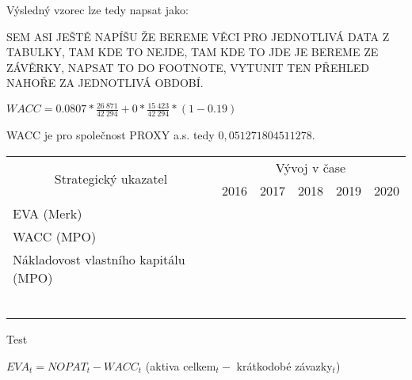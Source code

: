 Výsledný vzorec lze tedy napsat jako:

SEM ASI JEŠTĚ NAPÍŠU ŽE BEREME VĚCI PRO JEDNOTLIVÁ DATA Z TABULKY, TAM KDE TO NEJDE, TAM KDE TO JDE JE BEREME ZE ZÁVĚRKY, NAPSAT TO DO FOOTNOTE, VYTUNIT TEN PŘEHLED NAHOŘE ZA JEDNOTLIVÁ OBDOBÍ.

\begin{center}
$WACC = 0.0807 * \frac{26\ 871}{42\ 294} + 0 * \frac{15\ 423}{42\ 294} * (1 - 0.19)$	
\end{center}

WACC je pro společnost PROXY a.s. tedy $0,051271804511278$.


\begin{table}[!htbp]
\begin{tabular}{llllll}
\hline
\multicolumn{1}{|c|}{\multirow{2}{*}{Strategický ukazatel}} & \multicolumn{5}{c|}{Vývoj v čase} \\ \cline{2-6} 
\multicolumn{1}{|c|}{} & \multicolumn{1}{c|}{2016} & \multicolumn{1}{c|}{2017} & \multicolumn{1}{c|}{2018} & \multicolumn{1}{c|}{2019} & \multicolumn{1}{c|}{2020} \\ \hline
\multicolumn{1}{|l|}{EVA (Merk)} & \multicolumn{1}{l|}{} & \multicolumn{1}{l|}{} & \multicolumn{1}{l|}{} & \multicolumn{1}{l|}{} & \multicolumn{1}{l|}{} \\ \hline
\multicolumn{1}{|l|}{WACC (MPO)} & \multicolumn{1}{l|}{} & \multicolumn{1}{l|}{} & \multicolumn{1}{l|}{} & \multicolumn{1}{l|}{} & \multicolumn{1}{l|}{} \\ \hline
\multicolumn{1}{|l|}{Nákladovost vlastního kapitálu (MPO)} & \multicolumn{1}{l|}{} & \multicolumn{1}{l|}{} & \multicolumn{1}{l|}{} & \multicolumn{1}{l|}{} & \multicolumn{1}{l|}{} \\ \hline
 &  &  &  &  &  \\
 &  &  &  &  &  \\
 &  &  &  &  &  \\
 &  &  &  &  &  \\
 &  &  &  &  &  \\
 &  &  &  &  & 
\end{tabular}
\end{table}

Test 

$EVA_t = NOPAT_t - WACC_t$ (aktiva celkem$_t -$ krátkodobé závazky$_t$)

